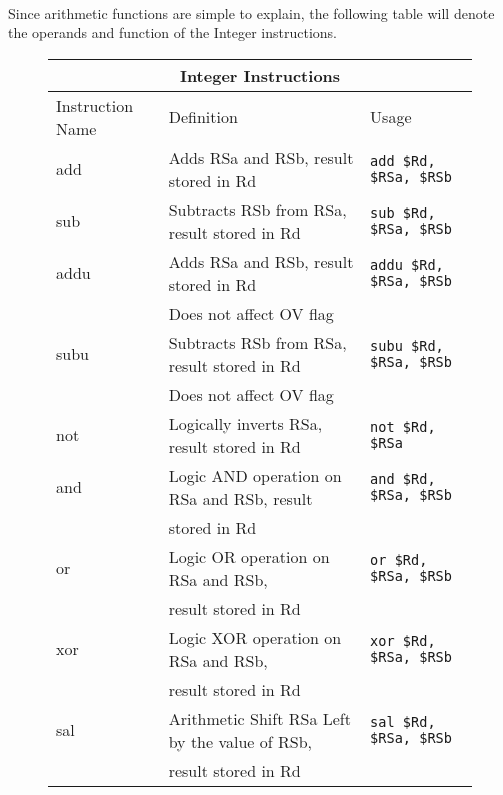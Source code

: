 \documentclass[letterpaper, 11pt]{article}
\begin{document}
\paragraph{} Since arithmetic functions are simple to explain, the following table will denote the operands and function of the Integer instructions. 

\begin{figure}[!h]
	\begin{center}
		\begin{tabular}{|l|l|l|}
			\hline
			\multicolumn{3}{c}{Integer Instructions} \\ \hline
			Instruction Name	& Definition															& Usage 							\\ \hline
			add					& Adds RSa and RSb, result stored in Rd									& \texttt{add \$Rd, \$RSa, \$RSb}	\\ \hline
			sub					& Subtracts RSb from RSa, result stored in Rd							& \texttt{sub \$Rd, \$RSa, \$RSb}	\\ \hline
			addu 				& Adds RSa and RSb, result stored in Rd 								& \texttt{addu \$Rd, \$RSa, \$RSb}	\\ 
			\hfill				& Does not affect OV flag												& \hfill 							\\ \hline
			subu 				& Subtracts RSb from RSa, result stored in Rd							& \texttt{subu \$Rd, \$RSa, \$RSb}	\\ 
			\hfill				& Does not affect OV flag												& \hfill 							\\ \hline
			not					& Logically inverts RSa, result stored in Rd							& \texttt{not \$Rd, \$RSa} 			\\ \hline
			and					& Logic AND operation on RSa and RSb, result							& \texttt{and \$Rd, \$RSa, \$RSb}	\\	
			\hfill				& stored in Rd															& \hfill 							\\ \hline
			or					& Logic OR operation on RSa and RSb, 									& \texttt{or \$Rd, \$RSa, \$RSb	}	\\ 	
			\hfill				& result stored in Rd													& \hfill 							\\ \hline
			xor					& Logic XOR operation on RSa and RSb,									& \texttt{xor \$Rd, \$RSa, \$RSb}	\\ 
			\hfill				& result stored in Rd													& \hfill 							\\ \hline	
			sal					& Arithmetic Shift RSa Left by the value of RSb,						& \texttt{sal \$Rd, \$RSa, \$RSb}	\\ 	
			\hfill				& result stored in Rd													& \hfill 							\\ \hline

\end{tabular}
\end{center}
\end{figure}
\end{document}
